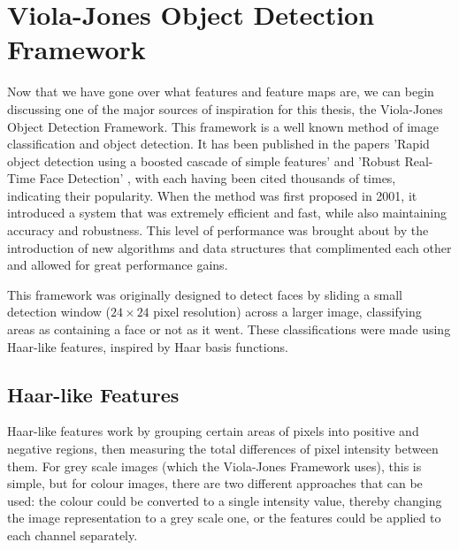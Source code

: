\documentclass[11pt,a4paper,oldfontcommands]{memoir}
\begin{document}
\section{Viola-Jones Object Detection Framework}
\label{s:viola}
Now that we have gone over what features and feature maps are, we can begin discussing one of the major sources of inspiration for this thesis, the Viola-Jones Object Detection Framework. This framework is a well known method of image classification and object detection. It has been published in the papers 'Rapid object detection using a boosted cascade of simple features' \cite{viola} and 'Robust Real-Time Face Detection' \cite{viola_updated}, with each having been cited thousands of times, indicating their popularity. When the method was first proposed in 2001, it introduced a system that was extremely efficient and fast, while also maintaining accuracy and robustness. This level of performance was brought about by the introduction of new algorithms and data structures that complimented each other and allowed for great performance gains.

This framework was originally designed to detect faces by sliding a small detection window ($24 \times 24$ pixel resolution) across a larger image, classifying areas as containing a face or not as it went. These classifications were made using Haar-like features, inspired by Haar basis functions. 

\subsection{Haar-like Features}
Haar-like features work by grouping certain areas of pixels into positive and negative regions, then measuring the total differences of pixel intensity between them. For grey scale images (which the Viola-Jones Framework uses), this is simple, but for colour images, there are two different approaches that can be used: the colour could be converted to a single intensity value, thereby changing the image representation to a grey scale one, or the features could be applied to each channel separately.
\end{document}
